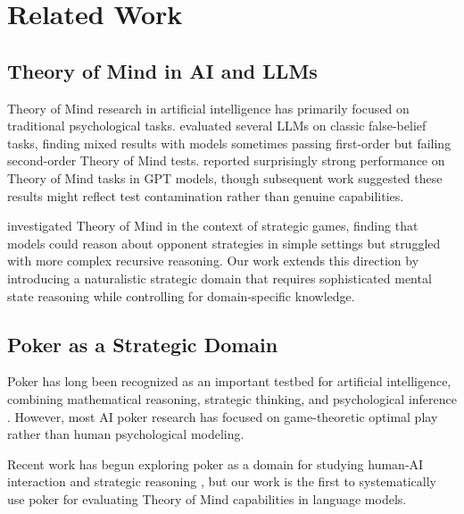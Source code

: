 \documentclass[11pt,a4paper]{article}
\begin{document}






\section{Related Work}
\label{sec:related_work}

\subsection{Theory of Mind in AI and LLMs}

Theory of Mind research in artificial intelligence has primarily focused on traditional psychological tasks. \citet{ullman2023large} evaluated several LLMs on classic false-belief tasks, finding mixed results with models sometimes passing first-order but failing second-order Theory of Mind tests. \citet{kosinski2023theory} reported surprisingly strong performance on Theory of Mind tasks in GPT models, though subsequent work \cite{shapira2023clever} suggested these results might reflect test contamination rather than genuine capabilities.

\citet{gandhi2023understanding} investigated Theory of Mind in the context of strategic games, finding that models could reason about opponent strategies in simple settings but struggled with more complex recursive reasoning. Our work extends this direction by introducing a naturalistic strategic domain that requires sophisticated mental state reasoning while controlling for domain-specific knowledge.

\subsection{Poker as a Strategic Domain}

Poker has long been recognized as an important testbed for artificial intelligence, combining mathematical reasoning, strategic thinking, and psychological inference \cite{brown2019superhuman}. However, most AI poker research has focused on game-theoretic optimal play rather than human psychological modeling. 

Recent work has begun exploring poker as a domain for studying human-AI interaction \cite{brown2020combining} and strategic reasoning \cite{liu2019generating}, but our work is the first to systematically use poker for evaluating Theory of Mind capabilities in language models.
\end{document}
